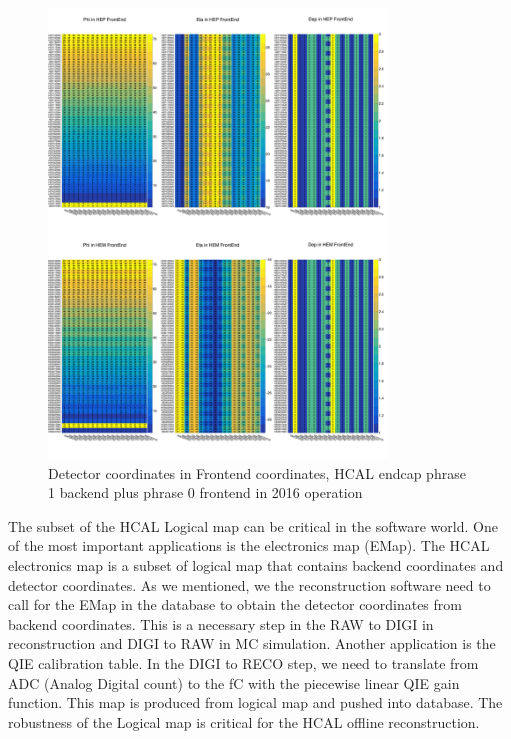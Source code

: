 \begin{figure}[htbp]
 \begin{center}
  \includegraphics[width=0.8\textwidth]{figures/c3/c3_cms_hcalhelmapfegeo.png}
 \end{center}
 \caption{Detector coordinates in Frontend coordinates, HCAL endcap phrase 1 backend plus phrase 0 frontend in 2016 operation}
 \label{fig:c3cmshcalhelmapfegeo}
\end{figure}


The subset of the HCAL Logical map can be critical in the software world. One of the most important applications is the electronics map (EMap). The HCAL electronics map is a subset of logical map that contains backend coordinates and detector coordinates. As we mentioned, we the reconstruction software need to call for the EMap in the database to obtain the detector coordinates from backend coordinates. This is a necessary step in the RAW to DIGI in reconstruction and DIGI to RAW in MC simulation. Another application is the QIE calibration table. In the DIGI to RECO step, we need to translate from ADC (Analog Digital count) to the fC with the piecewise linear QIE gain function. This map is produced from logical map and pushed into database. The robustness of the Logical map is critical for the HCAL offline reconstruction. 

